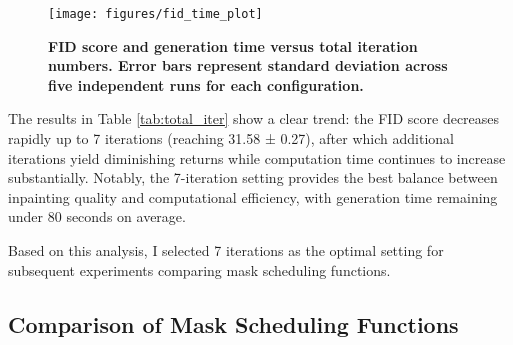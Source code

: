 \documentclass[twocolumn,a4paper]{article}
\begin{document}
\begin{figure*}[t]
    \centering
    \texttt{[image: figures/fid\_time\_plot]}
    \caption{\textbf{FID score and generation time versus total iteration numbers. Error bars represent standard deviation across five independent runs for each configuration.}}
    \label{fig:total_iter}
\end{figure*}

\begin{table}
\caption{\textbf{Mean $\pm$ standard deviation for FID Score and Generation Time across total iteration counts.}}
\label{tab:total_iter}
\centering
{}
\end{table}

The results in Table \ref{tab:total_iter} show a clear trend: the FID score decreases rapidly up to 7 iterations (reaching 31.58 ± 0.27), after which additional iterations yield diminishing returns while computation time continues to increase substantially. Notably, the 7-iteration setting provides the best balance between inpainting quality and computational efficiency, with generation time remaining under 80 seconds on average.

Based on this analysis, I selected 7 iterations as the optimal setting for subsequent experiments comparing mask scheduling functions.

\subsection{Comparison of Mask Scheduling Functions}
\end{document}
